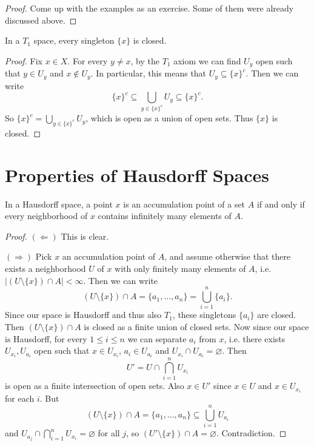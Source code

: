 \begin{proof}
  Come up with the examples as an exercise.
  Some of them were already discussed above.
\end{proof}

\begin{theorem}
  In a $T_1$ space, every singleton $\{x\}$ is
  closed.
\end{theorem}

\begin{proof}
  Fix $x \in X$. For every $y \ne x$, by the
  $T_1$ axiom we can find $U_y$ open such that
  $y \in U_y$ and $x \notin U_y$. In particular,
  this means that $U_y \subseteq \{x\}^c$. Then
  we can write
  \[
    \{x\}^c \subseteq \bigcup_{y \in \{x\}^c} U_y
    \subseteq \{x\}^c.
  \]
  So $\{x\}^c = \bigcup_{y \in \{x\}^c} U_y$,
  which is open as a union of open sets.
  Thus $\{x\}$ is closed.
\end{proof}

\section{Properties of Hausdorff Spaces}
\begin{theorem}
  In a Hausdorff space, a point
  $x$ is an accumulation point of
  a set $A$ if and only if every neighborhood
  of $x$ contains infinitely many elements of $A$.
\end{theorem}

\begin{proof}
  $(\Leftarrow)$ This is clear.

  $(\Rightarrow)$ Pick $x$ an accumulation point
  of $A$, and assume otherwise that there exists a
  neighborhood $U$ of $x$ with only finitely
  many elements of $A$, i.e.
  $|(U \setminus \{x\}) \cap A| < \infty$. Then
  we can write
  \[
    (U \setminus \{x\}) \cap A = \{a_1, \ldots, a_n\}
    = \bigcup_{i = 1}^n \{a_i\}.
  \]
  Since our space is Hausdorff and thus also $T_1$,
  these singletons $\{a_i\}$ are closed. Then
  $(U \setminus \{x\}) \cap A$ is closed as a
  finite union of closed sets. Now since
  our space is Hausdorff, for every
  $1 \le i \le n$ we can separate $a_i$ from $x$,
  i.e. there exists $U_{x_i}, U_{a_i}$ open
  such that $x \in U_{x_i}$, $a_i \in U_{a_i}$
  and $U_{x_i} \cap U_{a_i} = \varnothing$. Then
  \[
    U' = U \cap \bigcap_{i = 1}^n U_{x_i}
  \]
  is open as a finite intersection of open sets.
  Also $x \in U'$ since $x \in U$ and
  $x \in U_{x_i}$ for each $i$. But
  \[
    (U \setminus\{x\}) \cap A
    = \{a_1, \dots, a_n\}
    \subseteq \bigcup_{i = 1}^n U_{a_i}
  \]
  and $U_{a_j} \cap \bigcap_{i = 1}^n U_{x_i} = \varnothing$
  for all $j$, so
  $(U' \setminus \{x\}) \cap A = \varnothing$.
  Contradiction.
\end{proof}

